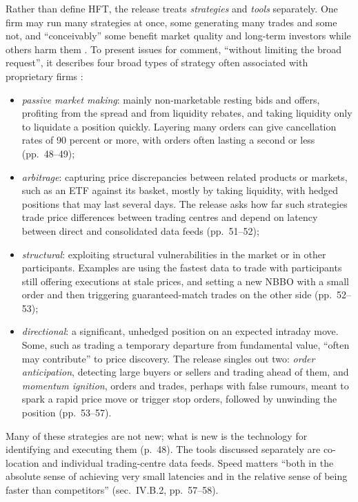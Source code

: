 \begin{qfdefinition}
Rather than define HFT, the release treats \emph{strategies} and \emph{tools} separately. One firm may run many strategies at once, some generating many trades and some not, and ``conceivably'' some benefit market quality and long-term investors while others harm them \citep[sec.~IV.B, p.~46]{sec-concept-release-2010}. To present issues for comment, ``without limiting the broad request'', it describes four broad types of strategy often associated with proprietary firms \citep[sec.~IV.B.1, pp.~48--57]{sec-concept-release-2010}:
\begin{itemize}
\item \emph{passive market making}: mainly non-marketable resting bids and offers, profiting from the spread and from liquidity rebates, and taking liquidity only to liquidate a position quickly. Layering many orders can give cancellation rates of 90 percent or more, with orders often lasting a second or less (pp.~48--49);
\item \emph{arbitrage}: capturing price discrepancies between related products or markets, such as an ETF against its basket, mostly by taking liquidity, with hedged positions that may last several days. The release asks how far such strategies trade price differences between trading centres and depend on latency between direct and consolidated data feeds (pp.~51--52);
\item \emph{structural}: exploiting structural vulnerabilities in the market or in other participants. Examples are using the fastest data to trade with participants still offering executions at stale prices, and setting a new NBBO with a small order and then triggering guaranteed-match trades on the other side (pp.~52--53);
\item \emph{directional}: a significant, unhedged position on an expected intraday move. Some, such as trading a temporary departure from fundamental value, ``often may contribute'' to price discovery. The release singles out two: \emph{order anticipation}, detecting large buyers or sellers and trading ahead of them, and \emph{momentum ignition}, orders and trades, perhaps with false rumours, meant to spark a rapid price move or trigger stop orders, followed by unwinding the position (pp.~53--57).
\end{itemize}
Many of these strategies are not new; what is new is the technology for identifying and executing them (p.~48). The tools discussed separately are co-location and individual trading-centre data feeds. Speed matters ``both in the absolute sense of achieving very small latencies and in the relative sense of being faster than competitors'' (sec.~IV.B.2, pp.~57--58).


\end{qfdefinition}
